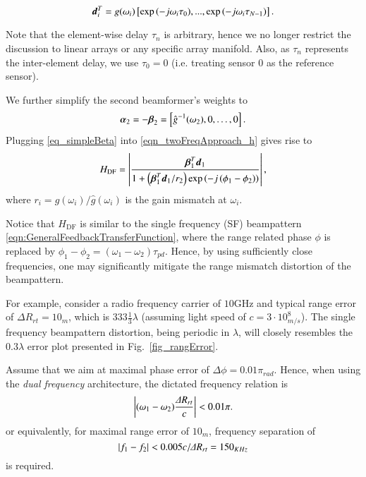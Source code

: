 \begin{equation}\label{eq:new_d}
\vd_{i}^T=g(\omega_i)\sBrack{\exp{\rBrace{-j\omega_i\tau_{0}}},...,\exp{\rBrace{-j\omega_i\tau_{N-1}}}}.
\end{equation}
\par Note that the element-wise delay $\tau_n$ is arbitrary, hence we no longer restrict the discussion to linear arrays or any specific array manifold. Also, as $\tau_n$ represents the inter-element delay, we use $\tau_0=0$ (i.e. treating sensor $0$ as the reference sensor).
\par We further simplify the second beamformer's weights to 
\begin{equation}\label{eq_simpleBeta}
    \vAlpha_{2}=-\vBeta_{2}=\vBrace{\hat{g}^{-1}(\omega_2),0,\hdots,0}.
\end{equation}
Plugging \eqref{eq_simpleBeta} into \eqref{eqn_twoFreqApproach_h} gives rise to 
\begin{equation}
    H_{\text{DF}} = \lBrace{\frac{\vBetaT_{1}\vd_{1}}{1+
    \rBrace{\vBetaT_{1}\vd_{1}/r_{2}}\exp\rBrace{-j\rBrace{\phi_{1}-\phi_{2}}}
    }},
    \label{eq_H_DF_general}
\end{equation}
where $r_i=g(\omega_i)/\hat{g}(\omega_i)$ is the gain mismatch at $\omega_i$. 
\par Notice that  $H_{\text{DF}}$ is similar to the single frequency (SF) beampattern \eqref{eqn:GeneralFeedbackTransferFunction}, where the range related phase $\phi$ is replaced by $\phi_{1}-\phi_{2}=(\omega_1-\omega_2)\tau_{pd}$. Hence, by using sufficiently close frequencies, one may significantly mitigate the range mismatch distortion of the beampattern.
\par For example, consider a radio frequency carrier of $10\text{GHz}$ and typical range error of $\Delta{}R_{rt}=10_m$, which is $333\frac{1}{3}\lambda$ (assuming light speed of $c=3\cdot 10^{8}_{m/s}$). The single frequency beampattern distortion, being periodic in $\lambda$, will closely resembles the $0.3\lambda$ error plot presented in Fig.~\ref{fig_rangError}. 
\par Assume that we aim at maximal phase error of $\Delta \phi=0.01\pi_{rad}$. Hence, when using the \textit{dual frequency} architecture, the dictated frequency relation is
\begin{equation}\label{eq_DF_phErr}
\abs{(\omega_1-\omega_2)\frac{\Delta{}R_{rt}}{c}}<0.01\pi.
\end{equation}
or equivalently, for maximal range error of $10_m$, frequency separation of
\[
\left\vert f_1-f_2\right\vert<0.005 c/\Delta{}R_{rt}=150_{KHz}
\]
is required. 

